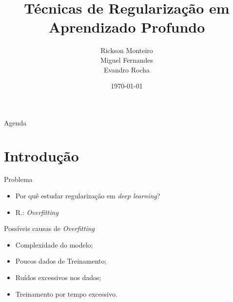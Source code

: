 \documentclass{beamer}
\title{Técnicas de Regularização em Aprendizado Profundo}
\author{Rickson Monteiro \\ Miguel Fernandes \\ Evandro Rocha   }
\date{\today}
\institute
{
  Universidade Federal do Rio de Janeiro\\
  UFRJ/COPPE/PEE
}
\begin{document}
{
\begin{frame}
  \bigskip\bigskip\bigskip\bigskip
  \titlepage
\end{frame}
}

\begin{frame}{Agenda}
  \tableofcontents
\end{frame}

\section{Introdução}

\begin{frame}{Problema}
\begin{itemize}
  \item Por quê estudar regularização em \textit{deep learning}?
  \item R.: \textit{Overfitting} 
\end{itemize}
\end{frame}

\begin{frame}{Possíveis causas de \textit{Overfitting}}
\begin{itemize}
  \item Complexidade do modelo;
  \item Poucos dados de Treinamento;
  \item Ruídos excessivos nos dados;
  \item Treinamento por tempo excessivo.
\end{itemize}
\end{frame}
\end{document}

